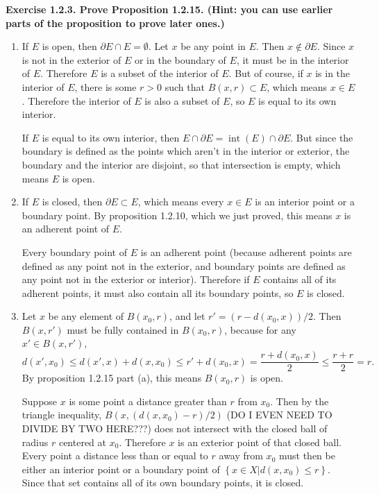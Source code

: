 \documentclass{article}
\begin{document}
\par
\textbf{Exercise 1.2.3. Prove Proposition 1.2.15. (Hint: you can use earlier parts of the proposition to prove later ones.)}
\par
\begin{enumerate}[label=(\alph*)]
    \item If $E$ is open, then $\partial E \cap E = \emptyset$. Let $x$ be any point in $E$. Then $x \not\in \partial E$. Since $x$ is not in the exterior of $E$ or in the boundary of $E$, it must be in the interior of $E$. Therefore $E$ is a subset of the interior of $E$. But of course, if $x$ is in the interior of $E$, there is some $r>0$ such that $B(x, r) \subset E$, which means $x \in E$. Therefore the interior of $E$ is also a subset of $E$, so $E$ is equal to its own interior.
        \par
        If $E$ is equal to its own interior, then $E \cap \partial E = \operatorname{int}(E) \cap \partial E$. But since the boundary is defined as the points which aren't in the interior or exterior, the boundary and the interior are disjoint, so that intersection is empty, which means $E$ is open.
    \item If $E$ is closed, then $\partial E \subset E$, which means every $x \in E$ is an interior point or a boundary point. By proposition 1.2.10, which we just proved, this means $x$ is an adherent point of $E$.
        \par
        Every boundary point of $E$ is an adherent point (because adherent points are defined as any point not in the exterior, and boundary points are defined as any point not in the exterior or interior). Therefore if $E$ contains all of its adherent points, it must also contain all its boundary points, so $E$ is closed.
    \item Let $x$ be any element of $B(x_0, r)$, and let $r'=(r-d(x_0, x))/2$. Then $B(x, r')$ must be fully contained in $B(x_0, r)$, because for any $x' \in B(x, r')$,
        \[ d(x', x_0) \leq d(x', x) + d(x, x_0) \leq r' + d(x_0, x) = \frac{r+d(x_0,x)}{2} \leq \frac{r+r}{2} = r. \]
        By proposition 1.2.15 part (a), this means $B(x_0, r)$ is open.
        \par
        Suppose $x$ is some point a distance greater than $r$ from $x_0$. Then by the triangle inequality, $B(x, (d(x, x_0)-r)/2)$ (DO I EVEN NEED TO DIVIDE BY TWO HERE???) does not intersect with the closed ball of radius $r$ centered at $x_0$. Therefore $x$ is an exterior point of that closed ball. Every point a distance less than or equal to $r$ away from $x_0$ must then be either an interior point or a boundary point of $ \left\{ x\in X | d(x, x_0) \leq r \right\}$. Since that set contains all of its own boundary points, it is closed.

\end{enumerate}
\end{document}
